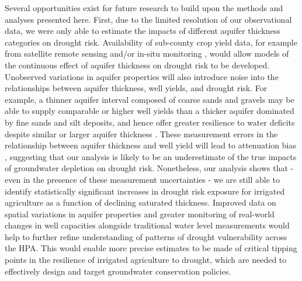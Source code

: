 \documentclass[
]{article}
\begin{document}
Several opportunities exist for future research to build upon the methods and analyses presented here. First, due to the limited resolution of our observational data, we were only able to estimate the impacts of different aquifer thickness categories on drought risk. Availability of sub-county crop yield data, for example from satellite remote sensing and/or in-situ monitoring \citep{edreira2020combining, deines2021million}, would allow models of the continuous effect of aquifer thickness on drought risk to be developed. Unobserved variations in aquifer properties will also introduce noise into the relationships between aquifer thickness, well yields, and drought risk. For example, a thinner aquifer interval composed of coarse sands and gravels may be able to supply comparable or higher well yields than a thicker aquifer dominated by fine sands and silt deposits, and hence offer greater resilience to water deficits despite similar or larger aquifer thickness \citep{butler2013interpretation, korus2020depletion}. These measurement errors in the relationship between aquifer thickness and well yield will lead to attenuation bias \citep{bound1991extent, hyslop2001bias}, suggesting that our analysis is likely to be an underestimate of the true impacts of groundwater depletion on drought risk. Nonetheless, our analysis shows that - even in the presence of these measurement uncertainties - we are still able to identify statistically significant increases in drought risk exposure for irrigated agriculture as a function of declining saturated thickness. Improved data on spatial variations in aquifer properties and greater monitoring of real-world changes in well capacities alongside traditional water level measurements would help to further refine understanding of patterns of drought vulnerability across the HPA. This would enable more precise estimates to be made of critical tipping points in the resilience of irrigated agriculture to drought, which are needed to effectively design and target groundwater conservation policies.
\end{document}

